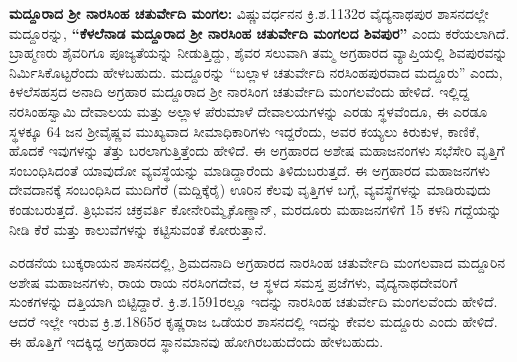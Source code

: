 \textbf{ಮದ್ದೂರಾದ ಶ‍್ರೀ ನಾರಸಿಂಹ ಚತುರ್ವೇದಿ ಮಂಗಲ:} ವಿಷ್ಣುವರ್ಧನನ ಕ್ರಿ.ಶ.1132ರ ವೈದ್ಯನಾಥಪುರ ಶಾಸನದಲ್ಲೇ ಮದ್ದೂರನ್ನು, \textbf{“ಕೆಳಲೆನಾಡ ಮದ್ದೂರಾದ ಶ‍್ರೀ ನಾರಸಿಂಹ ಚತುರ್ವೇದಿ ಮಂಗಲದ ಶಿವಪುರ”} ಎಂದು ಕರೆಯಲಾಗಿದೆ. ಬ್ರಾಹ್ಮಣರು ಶೈವರಿಗೂ ಪೂಜ್ಯತೆಯನ್ನು ನೀಡುತ್ತಿದ್ದು, ಶೈವರ ಸಲುವಾಗಿ ತಮ್ಮ ಅಗ್ರಹಾರದ ವ್ಯಾಪ್ತಿಯಲ್ಲಿ ಶಿವಪುರವನ್ನು ನಿರ್ಮಿಸಿಕೊಟ್ಟರೆಂದು ಹೇಳಬಹುದು. ಮದ್ದೂರನ್ನು “ಬಲ್ಲಾಳ ಚತುರ್ವೇದಿ ನರಸಿಂಹಪುರವಾದ ಮದ್ದೂರು” ಎಂದು,  ಕಿಳಲೆಸಹಸ್ರದ ಅನಾದಿ ಅಗ್ರಹಾರ ಮದ್ದೂರಾದ ಶ‍್ರೀ ನಾರಸಿಂಗ ಚತುರ್ವೇದಿ ಮಂಗಲವೆಂದು ಹೇಳಿದೆ. ಇಲ್ಲಿದ್ದ ನರಸಿಂಹಸ್ವಾಮಿ ದೇವಾಲಯ ಮತ್ತು ಅಲ್ಲಾಳ ಪೆರುಮಾಳೆ ದೇವಾಲಯಗಳನ್ನು ಎರಡು ಸ್ಥಳವೆಂದೂ, ಈ ಎರಡೂ ಸ್ಥಳಕ್ಕೂ 64 ಜನ ಶ‍್ರೀವೈಷ್ಣವ ಮುಖ್ಯವಾದ ಸೀಮಾಧಿಕಾರಿಗಳು ಇದ್ದರೆಂದು, ಅವರ ಕಯ್ಯಲು ಕಿರುಕುಳ, ಕಾಣಿಕೆ, ಹೊದಕೆ ಇವುಗಳನ್ನು ತೆತ್ತು ಬರಲಾಗುತ್ತಿತ್ತೆಂದು ಹೇಳಿದೆ. ಈ ಅಗ್ರಹಾರದ ಅಶೇಷ ಮಹಾಜನಂಗಳು ಸಭೆಸೇರಿ ವೃತ್ತಿಗೆ ಸಂಬಂಧಿಸಿದಂತೆ ಯಾವುದೋ ವ್ಯವಸ್ಥೆಯನ್ನು ಮಾಡಿದ್ದಾರೆಂದು ತಿಳಿದುಬರುತ್ತದೆ. ಈ ಅಗ್ರಹಾರದ ಮಹಾಜನಗಳು ದೇವದಾನಕ್ಕೆ ಸಂಬಂಧಿಸಿದ ಮುದಿಗೆರೆ (ಮದ್ದಿಕ್ಕೆರೈ) ಊರಿನ ಕೆಲವು ವೃತ್ತಿಗಳ ಬಗ್ಗೆ, ವ್ಯವಸ್ಥೆಗಳನ್ನು ಮಾಡಿರುವುದು ಕಂಡುಬರುತ್ತದೆ. ತ್ರಿಭುವನ ಚಕ್ರವರ್ತಿ ಕೋನೇರಿಮ್ಮೈಕೊಣ್ಡಾನ್​, ಮರದೂರು ಮಹಾಜನಗಳಿಗೆ 15 ಕಳನಿ ಗದ್ದೆಯನ್ನು ನೀಡಿ ಕೆರೆ ಮತ್ತು ಕಾಲುವೆಗಳನ್ನು ಕಟ್ಟಿಸುವಂತೆ ಕೋರುತ್ತಾನೆ.

ಎರಡನೆಯ ಬುಕ್ಕರಾಯನ ಶಾಸನದಲ್ಲಿ, ಶ್ರಿಮದನಾದಿ ಅಗ್ರಹಾರದ ನಾರಸಿಂಹ ಚತುರ್ವೇದಿ ಮಂಗಲವಾದ ಮದ್ದೂರಿನ ಅಶೇಷ ಮಹಾಜನಗಳು, ರಾಯ ರಾಯ ನರಸಿಂಗದೇವ, ಆ ಸ್ಥಳದ ಸಮಸ್ತ ಪ್ರಜೆಗಳು, ವೈದ್ಯನಾಥದೇವರಿಗೆ ಸುಂಕಗಳನ್ನು ದತ್ತಿಯಾಗಿ ಬಿಟ್ಟಿದ್ದಾರೆ. ಕ್ರಿ.ಶ.1591ರಲ್ಲೂ ಇದನ್ನು ನಾರಸಿಂಹ ಚತುರ್ವೇದಿ ಮಂಗಲವೆಂದು ಹೇಳಿದೆ. ಆದರೆ ಇಲ್ಲೇ ಇರುವ ಕ್ರಿ.ಶ.1865ರ ಕೃಷ್ಣರಾಜ ಒಡೆಯರ ಶಾಸನದಲ್ಲಿ ಇದನ್ನು ಕೇವಲ ಮದ್ದೂರು ಎಂದು ಹೇಳಿದೆ. ಈ ಹೊತ್ತಿಗೆ ಇದಕ್ಕಿದ್ದ ಅಗ್ರಹಾರದ ಸ್ಥಾನಮಾನವು ಹೋಗಿರಬಹುದೆಂದು ಹೇಳಬಹುದು.

